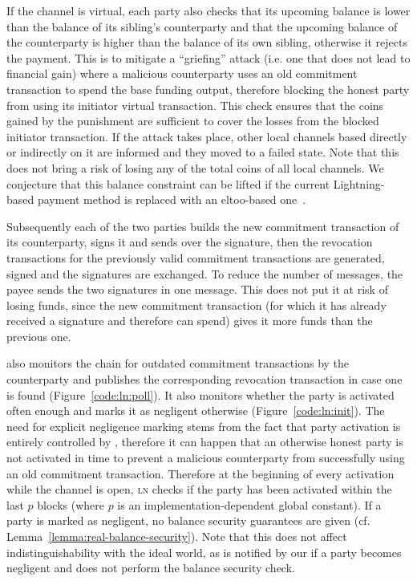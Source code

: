   If the channel is virtual, each party also checks that its upcoming balance is
  lower than the balance of its sibling's counterparty and that the upcoming
  balance of the counterparty is higher than the balance of its own sibling,
  otherwise it rejects the payment. This is to mitigate a ``griefing'' attack (i.e.
  one that does not lead to financial gain) where a malicious counterparty
  uses an old commitment transaction to spend the base funding output, therefore
  blocking the honest party from using its initiator virtual transaction. This
  check ensures that the coins gained by the punishment are sufficient to cover
  the losses from the blocked initiator transaction. If the attack takes place,
  other local channels based directly or indirectly on it are informed and they
  moved to a failed state. Note that this does not bring a risk of losing any of
  the total coins of all local channels. We conjecture that this balance
  constraint can be lifted if the current Lightning-based payment method is
  replaced with an eltoo-based one~\cite{eltoo}.

  Subsequently each of the two parties builds the new commitment transaction of
  its counterparty, signs it and sends over the signature, then the revocation
  transactions for the previously valid commitment transactions are generated,
  signed and the signatures are exchanged. To reduce the number of messages, the
  payee sends the two signatures in one message. This does not put it at risk of
  losing funds, since the new commitment transaction (for which it has already
  received a signature and therefore can spend) gives it more funds than the
  previous one.

  \pchan also monitors the chain for outdated commitment transactions by the
  counterparty and publishes the corresponding revocation transaction in case
  one is found (Figure~\ref{code:ln:poll}). It also monitors whether the party
  is activated often enough and marks it as negligent otherwise
  (Figure~\ref{code:ln:init}). The need for explicit negligence marking stems
  from the fact that party activation is entirely controlled by \environment,
  therefore it can happen that an otherwise honest party is not activated in
  time to prevent a malicious counterparty from successfully using an old
  commitment transaction. Therefore at the beginning of every activation while
  the channel is open, \textsc{ln} checks if the party has been activated within
  the last $p$ blocks (where $p$ is an implementation-dependent global
  constant). If a party is marked as negligent, no balance security guarantees
  are given (cf. Lemma~\ref{lemma:real-balance-security}). Note that this does
  not affect indistinguishability with the ideal world, as \fchan is notified by
  our \simulator if a party becomes negligent and does not perform the balance
  security check.

